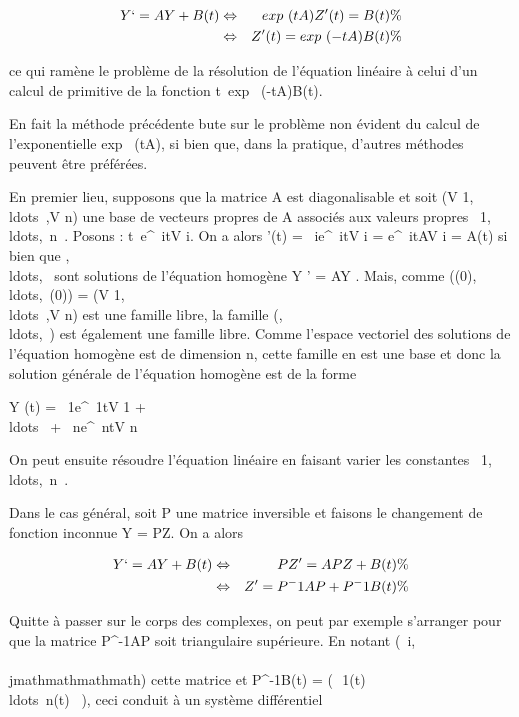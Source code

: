 \begin{align*} Y `= AY + B(t)&
\Leftrightarrow & exp~ (tA)Z'(t)
= B(t) \%& \\ &
\Leftrightarrow & Z'(t) = exp~
(-tA)B(t)\%& \\
\end{align*}

ce qui ramène le problème de la résolution de l'équation linéaire à
celui d'un calcul de primitive de la fonction
t\mapsto~exp~ (-tA)B(t).

En fait la méthode précédente bute sur le problème non évident du calcul
de l'exponentielle exp~ (tA), si bien que, dans
la pratique, d'autres méthodes peuvent être préférées.

En premier lieu, supposons que la matrice A est diagonalisable et soit
(V
1,\\ldots~,V
n) une base de vecteurs propres de A associés aux valeurs
propres
\lambda~1,\\ldots,\lambda~n~.
Posons \Phii :
t\mapsto~e^\lambda~itV i. On
a alors \Phii'(t) = \lambda~ie^\lambda~itV
i = e^\lambda~itAV i = A\Phii(t)
si bien que
,\\ldots,\Phin~
sont solutions de l'équation homogène Y ' = AY . Mais, comme
((0),\\ldots,\Phin~(0))
= (V
1,\\ldots~,V
n) est une famille libre, la famille
(,\\ldots,\Phin~)
est également une famille libre. Comme l'espace vectoriel des solutions
de l'équation homogène est de dimension n, cette famille en est une base
et donc la solution générale de l'équation homogène est de la forme

Y (t) = \alpha~1e^\lambda~1tV  1 +
\\ldots~ +
\alpha~ne^\lambda~ntV  n

On peut ensuite résoudre l'équation linéaire en faisant varier les
constantes
\alpha~1,\\ldots,\alpha~n~.

Dans le cas général, soit P une matrice inversible et faisons le
changement de fonction inconnue Y = PZ. On a alors

\begin{align*} Y `= AY + B(t)&
\Leftrightarrow & PZ' = APZ + B(t) \%&
\\ & \Leftrightarrow & Z' =
P^-1AP + P^-1B(t)\%&
\\ \end{align*}

Quitte à passer sur le corps des complexes, on peut par exemple
s'arranger pour que la matrice P^-1AP soit triangulaire
supérieure. En notant (\alpha~i,\\\\jmathmathmathmath) cette matrice et
P^-1B(t) = \left
(\matrix\,\beta~1(t)\\ldots\beta~n(t)~\right
), ceci conduit à un système différentiel

